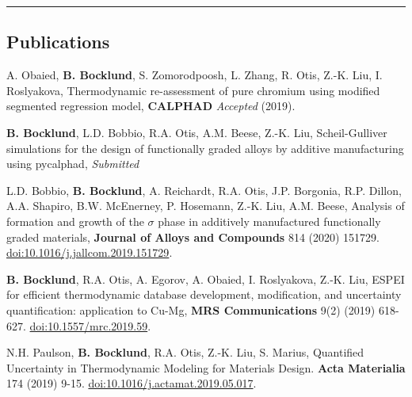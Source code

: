 \documentclass[10pt,letterpaper]{article}
\begin{document}
\hrule
\vspace{-0.6em}
\subsection*{Publications}

\begin{itemize*}


\item A. Obaied, \textbf{B. Bocklund}, S. Zomorodpoosh, L. Zhang, R. Otis, Z.-K. Liu, I. Roslyakova,
  Thermodynamic re-assessment of pure chromium using modified segmented regression model,
  \textbf{CALPHAD} \emph{Accepted} (2019).

\item \textbf{B. Bocklund}, L.D. Bobbio, R.A. Otis, A.M. Beese, Z.-K. Liu,
Scheil-Gulliver simulations for the design of functionally graded alloys by additive manufacturing using pycalphad,
\emph{Submitted}


\item L.D. Bobbio, \textbf{B. Bocklund}, A. Reichardt, R.A. Otis, J.P. Borgonia, R.P. Dillon, A.A. Shapiro, B.W. McEnerney, P. Hosemann, Z.-K. Liu, A.M. Beese,
Analysis of formation and growth of the $ \sigma $ phase in additively manufactured functionally graded materials,
\textbf{Journal of Alloys and Compounds} 814 (2020) 151729.
\href{https://doi.org/10.1016/j.jallcom.2019.151729}{doi:10.1016/j.jallcom.2019.151729}.

\item \textbf{B. Bocklund}, R.A. Otis, A. Egorov, A. Obaied, I. Roslyakova, Z.-K. Liu,
  ESPEI for efficient thermodynamic database development, modification, and uncertainty quantification: application to Cu-Mg,
  \textbf{MRS Communications} 9(2) (2019) 618-627.
  \href{https://doi.org/10.1557/mrc.2019.59}{doi:10.1557/mrc.2019.59}.

\item N.H. Paulson, \textbf{B. Bocklund}, R.A. Otis, Z.-K. Liu, S. Marius,
  Quantified Uncertainty in Thermodynamic Modeling for Materials Design.
  \textbf{Acta Materialia} 174 (2019) 9-15.
  \href{https://doi.org/10.1016/j.actamat.2019.05.017}{doi:10.1016/j.actamat.2019.05.017}.


\end{itemize*}
\end{document}
